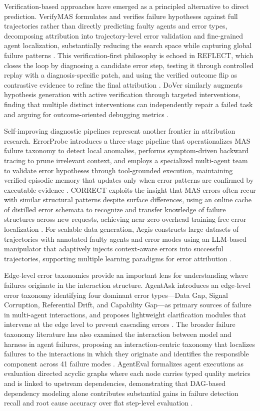 \documentclass[11pt]{article}
\begin{document}
Verification-based approaches have emerged as a principled alternative to direct prediction. VerifyMAS formulates and verifies failure hypotheses against full trajectories rather than directly predicting faulty agents and error types, decomposing attribution into trajectory-level error validation and fine-grained agent localization, substantially reducing the search space while capturing global failure patterns \cite{ref375}. This verification-first philosophy is echoed in REFLECT, which closes the loop by diagnosing a candidate error step, testing it through controlled replay with a diagnosis-specific patch, and using the verified outcome flip as contrastive evidence to refine the final attribution \cite{ref376}. DoVer similarly augments hypothesis generation with active verification through targeted interventions, finding that multiple distinct interventions can independently repair a failed task and arguing for outcome-oriented debugging metrics \cite{ref377}.

Self-improving diagnostic pipelines represent another frontier in attribution research. ErrorProbe introduces a three-stage pipeline that operationalizes MAS failure taxonomy to detect local anomalies, performs symptom-driven backward tracing to prune irrelevant context, and employs a specialized multi-agent team to validate error hypotheses through tool-grounded execution, maintaining verified episodic memory that updates only when error patterns are confirmed by executable evidence \cite{ref378}. CORRECT exploits the insight that MAS errors often recur with similar structural patterns despite surface differences, using an online cache of distilled error schemata to recognize and transfer knowledge of failure structures across new requests, achieving near-zero overhead training-free error localization \cite{ref379}. For scalable data generation, Aegis constructs large datasets of trajectories with annotated faulty agents and error modes using an LLM-based manipulator that adaptively injects context-aware errors into successful trajectories, supporting multiple learning paradigms for error attribution \cite{ref380}.

Edge-level error taxonomies provide an important lens for understanding where failures originate in the interaction structure. AgentAsk introduces an edge-level error taxonomy identifying four dominant error types---Data Gap, Signal Corruption, Referential Drift, and Capability Gap---as primary sources of failure in multi-agent interactions, and proposes lightweight clarification modules that intervene at the edge level to prevent cascading errors \cite{ref381}. The broader failure taxonomy literature has also examined the interaction between model and harness in agent failures, proposing an interaction-centric taxonomy that localizes failures to the interactions in which they originate and identifies the responsible component across 41 failure modes \cite{ref382}. AgentEval formalizes agent executions as evaluation directed acyclic graphs where each node carries typed quality metrics and is linked to upstream dependencies, demonstrating that DAG-based dependency modeling alone contributes substantial gains in failure detection recall and root cause accuracy over flat step-level evaluation \cite{ref331}.
\end{document}
